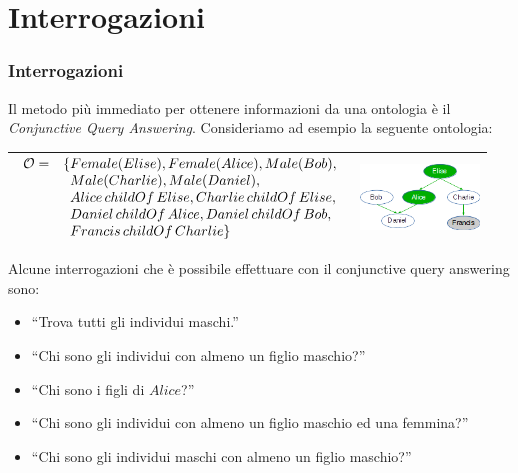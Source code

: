 \documentclass[8pt]{beamer}
\begin{document}
\section{Interrogazioni}

\begin{frame}
\frametitle{Interrogazioni}

Il metodo pi\`u immediato per ottenere informazioni da una ontologia \`e il 
\emph{Conjunctive Query Answering}. Consideriamo ad esempio la seguente ontologia:

\begin{tabular}{cc}
\hline
$\begin{array}{cl}
  \Ont  =  &  \{Female(Elise), Female(Alice), Male(Bob), \\
  &\phantom{\{}Male(Charlie), Male(Daniel), \\
  &\phantom{\{}Alice\,childOf\,Elise, Charlie\,childOf\,Elise, \\
  &\phantom{\{}Daniel\,childOf\,Alice, Daniel\,childOf\,Bob, \\
  &\phantom{\{}Francis\,childOf\,Charlie \}
 \end{array}$ & \includegraphics[width=120px]{family.png} \\
\hline
\end{tabular}

Alcune interrogazioni che \`e possibile effettuare con il conjunctive query 
answering sono:
\begin{itemize}
 \item ``Trova tutti gli individui maschi.''
 \item ``Chi sono gli individui con almeno un figlio maschio?''
 \item ``Chi sono i figli di $Alice$?''
 \item ``Chi sono gli individui con almeno un figlio maschio ed una femmina?''
 \item ``Chi sono gli individui maschi con almeno un figlio maschio?''
\end{itemize}
\end{frame}
\end{document}
